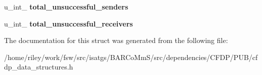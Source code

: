 \begin{DoxyCompactItemize}
\item 
u\+\_\+int\+\_ {\bfseries total\+\_\+unsuccessful\+\_\+senders}\hypertarget{struct_s_u_m_m_a_r_y___s_t_a_t_u_s_a158c55a37c8ab00bd34d2886219e2b9d}{}\label{struct_s_u_m_m_a_r_y___s_t_a_t_u_s_a158c55a37c8ab00bd34d2886219e2b9d}

\item 
u\+\_\+int\+\_ {\bfseries total\+\_\+unsuccessful\+\_\+receivers}\hypertarget{struct_s_u_m_m_a_r_y___s_t_a_t_u_s_ae54f5c8e0ca11ca9231a26a804169049}{}\label{struct_s_u_m_m_a_r_y___s_t_a_t_u_s_ae54f5c8e0ca11ca9231a26a804169049}

\end{DoxyCompactItemize}


The documentation for this struct was generated from the following file\+:\begin{DoxyCompactItemize}
\item 
/home/riley/work/fsw/src/isatgs/\+B\+A\+R\+Co\+Mm\+S/src/dependencies/\+C\+F\+D\+P/\+P\+U\+B/cfdp\+\_\+data\+\_\+structures.\+h\end{DoxyCompactItemize}
